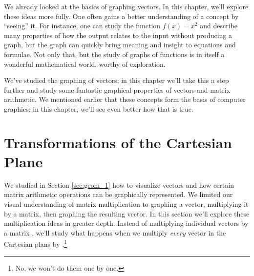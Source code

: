 We already looked at the basics of graphing vectors. In this chapter, we'll explore these ideas more fully. One often gains a better understanding of a concept by ``seeing'' it. For instance, one can study the function $f(x)=x^2$ and describe many properties of how the output relates to the input without producing a graph, but the graph can quickly bring meaning and insight to equations and formulae. Not only that, but the study of graphs of functions is in itself a wonderful mathematical world, worthy of exploration.

We've studied the graphing of vectors; in this chapter we'll take this a step further and study some fantastic graphical properties of vectors and matrix arithmetic. We mentioned earlier that these concepts form the basis of computer graphics; in this chapter, we'll see even better how that is true.

\section{Transformations of the Cartesian Plane}\label{sec:geom_3}


We studied in Section \ref{sec:geom_1} how to visualize vectors and how certain matrix arithmetic operations can be graphically represented. We limited our visual understanding of matrix  multiplication to graphing a vector, multiplying it by a matrix, then graphing the resulting vector. In this section we'll explore these multiplication ideas in greater depth. Instead of multiplying individual vectors by a matrix \tta, we'll study what happens when we multiply \textit{every} vector in the Cartesian plans by \tta.\footnote{No, we won't do them one by one.} \\


